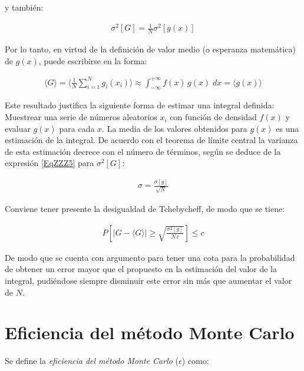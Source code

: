 y tambi\'en:

\begin{eqnarray}
 	\sigma ^{2} [G] = \frac{1}{N} \sigma ^{2} [g(x)]
 \label{EqZZZ5} 
\end{eqnarray}


Por lo tanto, en virtud de la definici\'on de valor medio (o esperanza matem\'atica) de $g(x)$,  puede escribirse en la forma:

\begin{eqnarray}
 	\langle G \rangle = \langle \frac{1}{N} \sum_{i=1}^{N} g_{i}(x_{i}) \rangle \approx \int _{-\infty} ^{+ \infty} f(x) \, g(x) \; dx =
 	\langle g(x) \rangle
 \label{EqZZZ6} 
\end{eqnarray}

Este resultado justifica la siguiente forma de estimar una integral definida: Muestrear una serie de n\'umeros aleatorios $x_{i}$ con 
funci\'on de densidad $f(x)$ y evaluar $g(x)$ para cada $x$. La media de los valores obtenidos para $g(x)$ es una estimaci\'on de la 
integral. De acuerdo con el teorema de l\'imite central la varianza de esta estimaci\'on decrece con el n\'umero de t\'erminos, seg\'un se 
deduce de la expresi\'on \ref{EqZZZ5} para $\sigma ^{2} [G]$:

\begin{eqnarray}
 	\sigma = \frac{\sigma [g]}{\sqrt{N}}
 \label{EqZZZ7} 
\end{eqnarray}


Conviene tener presente la desigualdad de Tchebycheff, de modo que se tiene:

\begin{eqnarray}
 	P \left[ \lvert G - \langle G \rangle \rvert \ge \sqrt{\frac{\sigma ^{2} [g]}{N \, c}} \right] \le c
 \label{EqZZZ8} 
\end{eqnarray}

De modo que se cuenta con argumento para tener una cota para la probabilidad de obtener un error mayor que el propuesto en la estimaci\'on 
del valor de la integral, pudi\'endose siempre disminuir este error sin m\'as que aumentar el valor de $N$.

\section{Eficiencia del m\'etodo Monte Carlo}
\label{CapVII_2}

Se define la \textit{eficiencia del m\'etodo Monte Carlo} ($\epsilon$) como:

